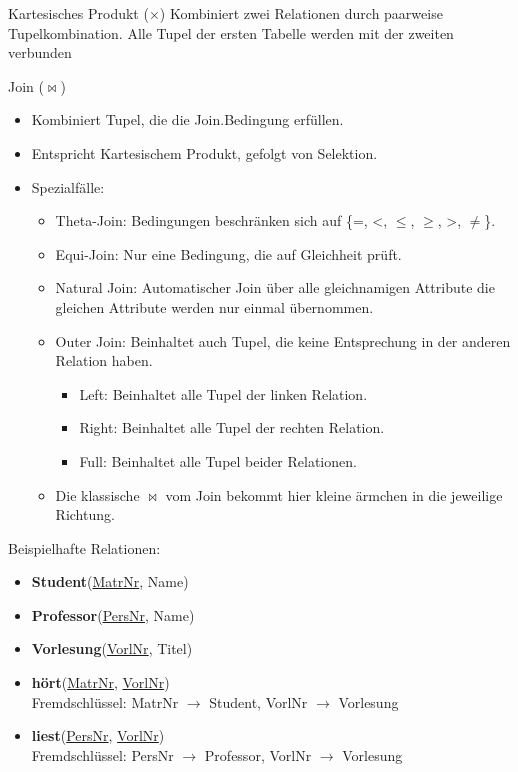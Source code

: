\documentclass{article}
\begin{document}
\begin{block}{Kartesisches Produkt ($\times$)}
Kombiniert zwei Relationen durch paarweise Tupelkombination. Alle Tupel der ersten Tabelle werden mit der zweiten verbunden
\end{block}

\begin{block}{Join ($\bowtie$)}
  \begin{itemize}
    \item Kombiniert Tupel, die die Join.Bedingung erfüllen.
    \item Entspricht Kartesischem Produkt, gefolgt von Selektion.
    \item Spezialfälle:
    \begin{itemize}
      \item Theta-Join: Bedingungen beschränken sich auf \{=, <, $\leq$, $\geq$, >, $\neq$\}.
      \item Equi-Join: Nur eine Bedingung, die auf Gleichheit prüft.
      \item Natural Join: Automatischer Join über alle gleichnamigen Attribute die gleichen Attribute werden nur einmal übernommen.
      \item Outer Join: Beinhaltet auch Tupel, die keine Entsprechung in der anderen Relation haben.
      \begin{itemize}
        \item Left: Beinhaltet alle Tupel der linken Relation.
        \item Right: Beinhaltet alle Tupel der rechten Relation.
        \item Full: Beinhaltet alle Tupel beider Relationen.
      \end{itemize}
      \item Die klassische $\bowtie$ vom Join bekommt hier kleine ärmchen in die jeweilige Richtung.
    \end{itemize}
  \end{itemize}
\end{block}


Beispielhafte Relationen:
\begin{itemize}
  \item \textbf{Student}(\underline{MatrNr}, Name)
  \item \textbf{Professor}(\underline{PersNr}, Name)
  \item \textbf{Vorlesung}(\underline{VorlNr}, Titel)
  \item \textbf{hört}(\underline{MatrNr}, \underline{VorlNr}) \\
        Fremdschlüssel: MatrNr $\rightarrow$ Student, VorlNr $\rightarrow$ Vorlesung
  \item \textbf{liest}(\underline{PersNr}, \underline{VorlNr}) \\
        Fremdschlüssel: PersNr $\rightarrow$ Professor, VorlNr $\rightarrow$ Vorlesung
\end{itemize}
\end{document}
